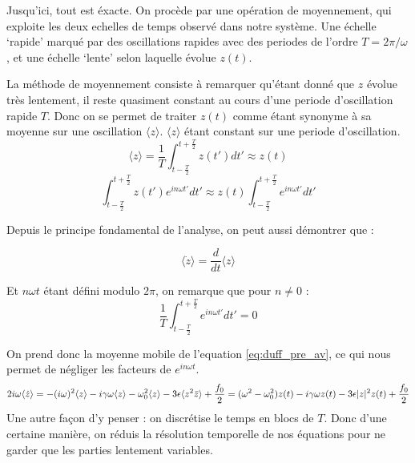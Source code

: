 Jusqu'ici, tout est éxacte. On procède par une opération de moyennement, qui exploite les deux echelles de temps observé dans notre système. 
Une échelle `rapide' marqué par des oscillations rapides avec des periodes de l'ordre $T = 2\pi / \omega$, 
et une échelle `lente' selon laquelle évolue $z(t)$. 

La méthode de moyennement consiste à remarquer qu'étant donné que $z$ évolue très lentement, 
il reste quasiment constant au cours d'une periode d'oscillation rapide $T$. 
Donc on se permet de traiter $z(t)$ comme étant synonyme à sa moyenne sur une oscillation $\langle z \rangle$. $\langle z \rangle$ étant constant sur une periode d'oscillation.
\begin{equation}
    \langle z \rangle = \frac{1}{T}\int_{t-\frac{T}{2}}^{t+\frac{T}{2}}{z(t')}dt' \approx  z(t)
\end{equation}
\begin{equation}
    \int_{t-\frac{T}{2}}^{t+\frac{T}{2}}{z(t')e^{in\omega t'}}dt'  \approx z(t) \int_{t-\frac{T}{2}}^{t+\frac{T}{2}}{e^{in\omega t'}}dt'
\end{equation}

Depuis le principe fondamental de l'analyse, on peut aussi démontrer que :

\begin{equation}
    \langle \dot{z} \rangle = \frac{d}{dt} \langle z \rangle
\end{equation}

Et $n \omega t$ étant défini modulo $2\pi$, on remarque que pour $n \neq 0$ :
\begin{equation*}
    \frac{1}{T}\int_{t-\frac{T}{2}}^{t+\frac{T}{2}}{e^{in\omega t'}}dt' = 0
\end{equation*}

On prend donc la moyenne mobile de l'equation \eqref{eq:duff_pre_av}, 
ce qui nous permet de négliger les facteurs de $e^{i n\omega t}$.
\begin{dmath}
    2i\omega \langle \dot{z} \rangle = - (i\omega)^2 \langle z \rangle
    - i\gamma\omega \langle z \rangle
    - \omega_0^2 \langle z \rangle 
    - 3 \epsilon \langle z^2 \bar{z} \rangle
    + \frac{f_0}{2} \\
    = (\omega^2 - \omega_0^2)z(t) - i\gamma\omega z(t) - 3\epsilon |z|^2 z(t) + \frac{f_0}{2}
\end{dmath}
Une autre façon d'y  penser :  on discrétise le temps en blocs de $T$. 
Donc d'une certaine manière, on réduis la résolution temporelle de nos équations pour ne garder que les parties lentement variables.

